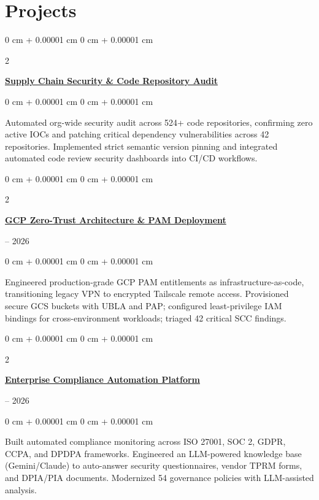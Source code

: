 \documentclass[10pt, letterpaper]{article}
\newenvironment{onecolentry}{
    \begin{adjustwidth}{
        0 cm + 0.00001 cm
    }{
        0 cm + 0.00001 cm
    }
}{
    \end{adjustwidth}
}
\newenvironment{twocolentry}[2][]{
    \onecolentry
    \def\secondColumn{#2}
    \setcolumnwidth{\fill, 4.5 cm}
    \begin{paracol}{2}
}{
    \switchcolumn \raggedleft \secondColumn
    \end{paracol}
    \endonecolentry
}
\begin{document}
\section{Projects}
\vspace{0.10 cm}

\vspace{0.2 cm}

\begin{twocolentry}{2026}
    \textbf{\href{https://github.com/chinmay-dhok/Supply-Chain-Security-Hardening}{Supply Chain Security \& Code Repository Audit}}
\end{twocolentry}
\vspace{0.10 cm}
\begin{onecolentry}
    Automated org-wide security audit across 524+ code repositories, confirming zero active IOCs and patching critical dependency vulnerabilities across 42 repositories. Implemented strict semantic version pinning and integrated automated code review security dashboards into CI/CD workflows.
\end{onecolentry}

\vspace{0.2 cm}

\begin{twocolentry}{2025 -- 2026}
    \textbf{\href{https://github.com/chinmay-dhok/GCP-Zero-Trust-Architecture}{GCP Zero-Trust Architecture \& PAM Deployment}}
\end{twocolentry}
\vspace{0.10 cm}
\begin{onecolentry}
    Engineered production-grade GCP PAM entitlements as infrastructure-as-code, transitioning legacy VPN to encrypted Tailscale remote access. Provisioned secure GCS buckets with UBLA and PAP; configured least-privilege IAM bindings for cross-environment workloads; triaged 42 critical SCC findings.
\end{onecolentry}

\vspace{0.2 cm}

\begin{twocolentry}{2025 -- 2026}
    \textbf{\href{https://github.com/chinmay-dhok/Automated-Compliance-Auditor}{Enterprise Compliance Automation Platform}}
\end{twocolentry}
\vspace{0.10 cm}
\begin{onecolentry}
    Built automated compliance monitoring across ISO 27001, SOC 2, GDPR, CCPA, and DPDPA frameworks. Engineered an LLM-powered knowledge base (Gemini/Claude) to auto-answer security questionnaires, vendor TPRM forms, and DPIA/PIA documents. Modernized 54 governance policies with LLM-assisted analysis.
\end{onecolentry}
\end{document}
